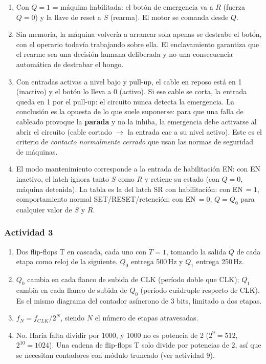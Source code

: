 \begin{enumerate}[label=\textbf{\alph*)}]
    \item Con $Q = 1$ = máquina habilitada: el botón de emergencia va a $R$ (fuerza $Q = 0$) y la llave de reset a $S$ (rearma). El motor se comanda desde $Q$.
    \item Sin memoria, la máquina volvería a arrancar sola apenas se destrabe el botón, con el operario todavía trabajando sobre ella. El enclavamiento garantiza que el rearme sea una decisión humana deliberada y no una consecuencia automática de destrabar el hongo.
    \item Con entradas activas a nivel bajo y pull-up, el cable en reposo está en 1 (inactivo) y el botón lo lleva a 0 (activo). Si ese cable se corta, la entrada queda en 1 por el pull-up: el circuito nunca detecta la emergencia. La conclusión es la opuesta de lo que suele suponerse: para que una falla de cableado provoque la \textbf{parada} y no la inhiba, la emergencia debe activarse al abrir el circuito (cable cortado $\rightarrow$ la entrada cae a su nivel activo). Este es el criterio de \textit{contacto normalmente cerrado} que usan las normas de seguridad de máquinas.
    \item El modo mantenimiento corresponde a la entrada de habilitación EN: con EN inactivo, el latch ignora tanto $S$ como $R$ y retiene su estado (con $Q = 0$, máquina detenida). La tabla es la del latch SR con habilitación: con EN$\,=1$, comportamiento normal SET/RESET/retención; con EN$\,=0$, $Q = Q_0$ para cualquier valor de $S$ y $R$.
\end{enumerate}

\subsubsection*{Actividad 3}

\begin{enumerate}[label=\textbf{\alph*)}]
    \item Dos flip-flops T en cascada, cada uno con $T = 1$, tomando la salida $Q$ de cada etapa como reloj de la siguiente. $Q_0$ entrega 500\,Hz y $Q_1$ entrega 250\,Hz.
    \item $Q_0$ cambia en cada flanco de subida de CLK (período doble que CLK); $Q_1$ cambia en cada flanco de subida de $Q_0$ (período cuádruple respecto de CLK). Es el mismo diagrama del contador asíncrono de 3 bits, limitado a dos etapas.
    \item $f_N = f_{CLK} / 2^N$, siendo $N$ el número de etapas atravesadas.
    \item No. Haría falta dividir por 1000, y 1000 no es potencia de 2 ($2^9 = 512$, $2^{10} = 1024$). Una cadena de flip-flops T solo divide por potencias de 2, así que se necesitan contadores con módulo truncado (ver actividad 9).
\end{enumerate}

